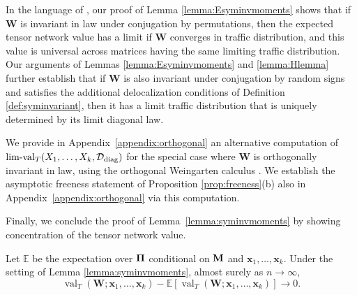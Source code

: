 \documentclass[10pt,reqno]{amsart}
\def\x{\mathbf{x}}
\def\W{\mathbf{W}}
\def\E{\mathbb{E}}
\def\val{\operatorname{val}}
\def\limval{\operatorname{lim-val}}
\def\bW{{\mathbf{W}}}
\newcommand{\tdiag}{\mathrm{diag}}
\begin{document}
\begin{remark}
In the language of \cite{male2020traffic}, our proof of Lemma
\ref{lemma:Esyminvmoments} shows that if $\W$ is invariant in law
under conjugation by
permutations, then the expected tensor network value has a limit if
$\W$ converges in traffic distribution, and this value is universal
across matrices having the same limiting traffic distribution. Our arguments of
Lemmas \ref{lemma:Esyminvmoments} and \ref{lemma:Hlemma} further establish that
if $\W$ is also invariant under conjugation by random signs and satisfies the 
additional delocalization conditions of Definition \ref{def:syminvariant},
then it has a limit traffic distribution that is uniquely determined by
its limit diagonal law.
\end{remark}

We provide in Appendix~\ref{appendix:orthogonal} an alternative computation of 
$\limval_T(X_1,\ldots,X_k,\cD_\tdiag)$ for the special case where
$\bW$ is orthogonally invariant in law,
using the orthogonal Weingarten calculus \cite{collins2006integration}. We
establish the asymptotic freeness statement of Proposition \ref{prop:freeness}(b)
also in Appendix~\ref{appendix:orthogonal} via this computation.

Finally, we conclude the proof of Lemma~\ref{lemma:syminvmoments} by showing
concentration of the tensor network value.

\begin{lemma}\label{lemma:syminvfourthmoment}
Let $\E$ be the expectation over $\bm{\Pi}$ conditional on $\mathbf{M}$
and $\x_1,\ldots,\x_k$. Under the setting of Lemma \ref{lemma:syminvmoments},
almost surely as $n \to \infty$,
\[\val_T(\W;\x_1,\ldots,\x_k)-\E[\val_T(\W;\x_1,\ldots,\x_k)] \to 0.\]
\end{lemma}
\end{document}
